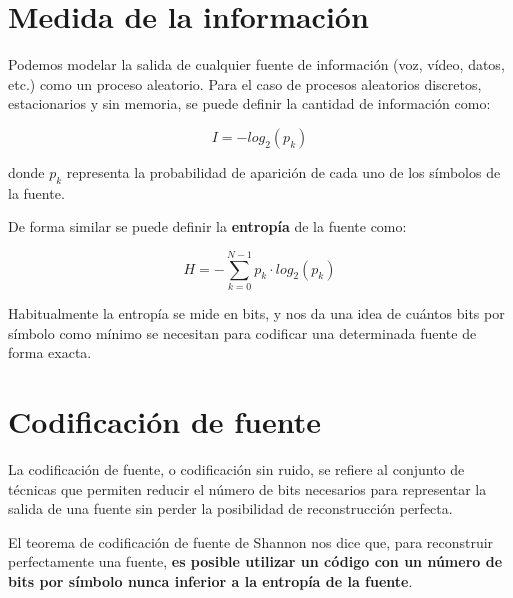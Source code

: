 \documentclass[es,apuntes]{uah}
\begin{document}

\maketitle


\section{Medida de la información}

Podemos modelar la salida de cualquier fuente de información (voz, vídeo, datos, etc.) como un proceso aleatorio. Para el caso de procesos aleatorios discretos, estacionarios y sin memoria, se puede definir la cantidad de información como:

\begin{displaymath}
	I = -log_2(p_k)
\end{displaymath}

donde $p_k$ representa la probabilidad de aparición de cada uno de los símbolos de la fuente. 

De forma similar se puede definir la {\bf entropía} de la fuente como:

\begin{equation}
	H = - \sum_{k=0}^{N-1}p_k \cdot  log_2(p_k)
\end{equation}

Habitualmente la entropía se mide en bits, y nos da una idea de cuántos bits por símbolo como mínimo se necesitan para codificar una determinada fuente de forma exacta.

\section{Codificación de fuente}

La codificación de fuente, o codificación sin ruido, se refiere al conjunto de técnicas que permiten reducir el número de bits necesarios para representar la salida de una fuente sin perder la posibilidad de reconstrucción perfecta. 

El teorema de codificación de fuente de Shannon nos dice que, para reconstruir perfectamente una fuente, {\bf es posible utilizar un código con un número de bits por símbolo nunca inferior a la entropía de la fuente}.
\end{document}
